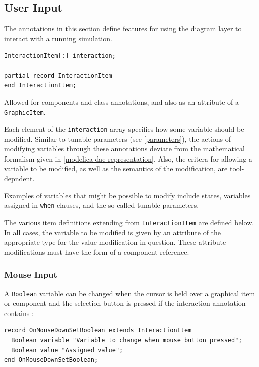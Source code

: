 \subsection{User Input}\label{user-input}

The annotations in this section define features for using the diagram layer to interact with a running simulation.

\begin{annotationdefinition}[interaction]
\begin{synopsis}\begin{lstlisting}
InteractionItem[:] interaction;

partial record InteractionItem
end InteractionItem;
\end{lstlisting}%
%
\end{synopsis}
\begin{semantics}
Allowed for components and class annotations, and also as an attribute of a \lstinline!GraphicItem!.

Each element of the \lstinline!interaction! array specifies how some variable should be modified.
Similar to tunable parameters (see \cref{parameters}), the actions of modifying variables through these annotations deviate from the mathematical formalism given in \cref{modelica-dae-representation}.
Also, the critera for allowing a variable to be modified, as well as the semantics of the modification, are tool-depndent.

\begin{nonnormative}
Examples of variables that might be possible to modify include states, variables assigned in \lstinline!when!-clauses, and the so-called tunable parameters.
\end{nonnormative}
\end{semantics}
\end{annotationdefinition}

The various item definitions extending from \lstinline!InteractionItem! are defined below.
In all cases, the variable to be modified is given by an attribute of the appropriate type for the value modification in question.
These attribute modifications must have the form of a component reference.

\subsubsection{Mouse Input}\label{mouse-input}

A \lstinline!Boolean! variable can be changed when the cursor is held over a graphical item or component and the selection button is pressed if the interaction annotation contains :
\begin{lstlisting}[language=modelica]
record OnMouseDownSetBoolean extends InteractionItem
  Boolean variable "Variable to change when mouse button pressed";
  Boolean value "Assigned value";
end OnMouseDownSetBoolean;
\end{lstlisting}

